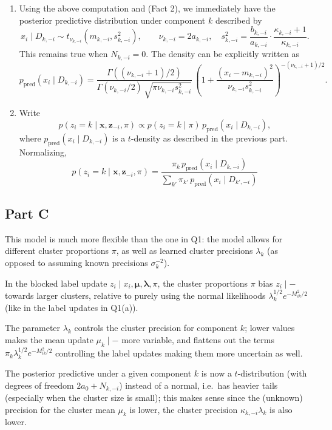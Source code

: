 \documentclass[12pt]{article}
\begin{document}
\begin{enumerate}[label=(\alph*), resume]
    \item Using the above computation and (Fact 2), we immediately have the
    posterior predictive distribution under component $k$ described by \[
    \boxed{
        x_i\mid D_{k, -i} \sim t_{\nu_{k, -i}}(m_{k, -i}, s_{k, -i}^2), \qquad
        \nu_{k, -i} = 2a_{k, -i}, \quad
        s_{k, -i}^2 = \frac{b_{k, -i}}{a_{k, -i}} \cdot \frac{\kappa_{k, -i} + 1}{\kappa_{k, -i}}.
    }
    \]
    This remains true when $N_{k, -i} = 0$.
    The density can be explicitly written as \[
        p_{\text{pred}}(x_i\mid D_{k, -i})
            = \frac{\Gamma((\nu_{k, -i} + 1) / 2)}{\Gamma(\nu_{k, -i} / 2)\,\sqrt{\pi\nu_{k, -i}s_{k, -i}^2}}\,
                \left(1 + \frac{(x_i - m_{k, -i})^2}{\nu_{k, -i}s_{k, -i}^2}\right)^{-(\nu_{k, -i} + 1) / 2}.
    \]


    \item Write \[
        p(z_i = k \mid \bm{x}, \bm{z}_{-i}, \pi)
            \propto p(z_i = k\mid \pi)\, p_{\text{pred}}(x_i \mid D_{k, -i}),
    \] where $p_{\text{pred}}(x_i\mid D_{k, -i})$ is a $t$-density as described
    in the previous part.
    Normalizing, \[
    \boxed{
        p(z_i = k\mid \bm{x}, \bm{z}_{-i}, \pi)
            = \frac{\pi_k\, p_{\text{pred}}(x_i\mid D_{k, -i})}{\sum_{k'} \pi_{k'}\, p_{\text{pred}}(x_i\mid D_{k', -i})}
    }
    \]
\end{enumerate}


\subsection*{Part C}

This model is much more flexible than the one in Q1: the model allows for
different cluster proportions $\pi$, as well as learned cluster precisions
$\lambda_k$ (as opposed to assuming known precisions $\sigma_k^{-2}$).

In the blocked label update $z_i \mid x_i, \bm{\mu}, \bm{\lambda}, \pi$, the
cluster proportions $\pi$ bias $z_i\mid -$ towards larger clusters, relative to
purely using the normal likelihoods $\lambda_k^{1 /2}e^{-M_{ik}^2 /2}$ (like in
the label updates in Q1(a)).

The parameter $\lambda_k$ controls the cluster precision for component $k$;
lower values makes the mean update $\mu_k\mid -$ more variable, and flattens
out the terms $\pi_k\lambda_k^{1 /2}e^{-M_{ik}^2 /2}$ controlling the label
updates making them more uncertain as well.

The posterior predictive under a given component $k$ is now a $t$-distribution
(with degrees of freedom $2a_0 + N_{k, -i}$) instead of a normal, i.e.\ has
heavier tails (especially when the cluster size is small); this makes sense
since the (unknown) precision for the cluster mean $\mu_k$ is lower, the
cluster precision $\kappa_{k, -i}\lambda_k$ is also lower.
\end{document}
